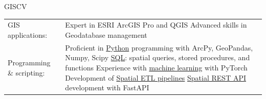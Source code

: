 \documentclass[letterpaper]{article}
\newenvironment{skillslist}
        {
            \hspace*{-0.07in}\begin{tabular}[t]{ l L{5.17in} }
        }{
            \end{tabular}
        }
\newcommand{\impt}[1]{\uline{#1}}
\begin{document}
    \begin{taggedblock}{GISCV}
        \begin{skillslist}
            GIS applications:&
                Expert in ESRI ArcGIS Pro and QGIS \linebreak
                Advanced skills in Geodatabase management\linebreak
                \\
            Programming \& scripting:&
                Proficient in \impt{Python} programming with ArcPy, GeoPandas, Numpy, Scipy\linebreak
                \impt{SQL}: spatial queries, stored procedures, and functions \linebreak
                Experience with \impt{machine learning} with PyTorch \linebreak
                Development of \impt{Spatial ETL pipelines} \linebreak
                \impt{Spatial REST API} development with FastAPI \linebreak
                \\

\end{skillslist}
\end{taggedblock}
\end{document}
